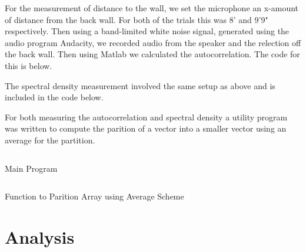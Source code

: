 \documentclass{article}
\begin{document}
      For the measurement of distance to the wall, we set the microphone
      an x-amount of distance from the back wall. For both of the trials this
      was 8' and 9'9" respectively. Then using a band-limited white noise
      signal, generated using the audio program Audacity, we recorded audio
      from the speaker and the relection off the back wall. Then using Matlab
      we calculated the autocorrelation. The code for
      this is below.

      The spectral density measurement involved the same setup as above
      and is included in the code below.

      For both measuring the autocorrelation and spectral density a
      utility program was written to compute the parition of a vector
      into a smaller vector using an average for the partition.

      \begin{listing}
         \inputminted[linenos]{matlab}{../main.m}
         \caption{Main Program}
      \end{listing}
      \begin{listing}
         \inputminted[linenos]{matlab}{../partition.m}
         \caption{Function to Parition Array using Average Scheme}
      \end{listing}
   \section{Analysis}
\end{document}

